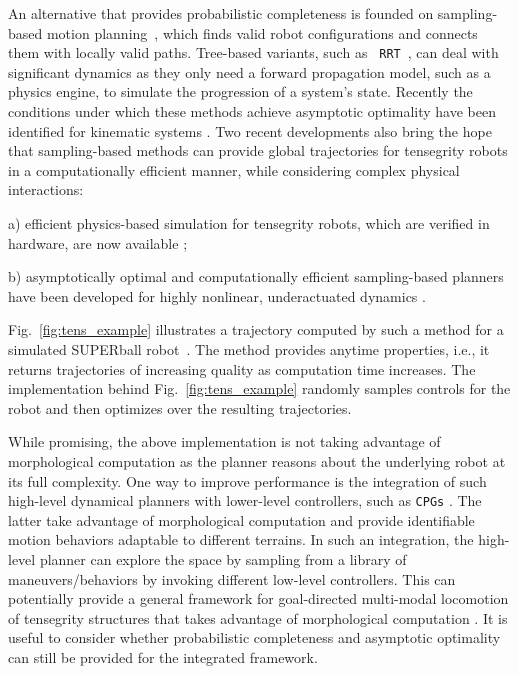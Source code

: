 An alternative that provides probabilistic completeness is founded on
sampling-based motion planning~\cite{Kavraki1996Probabilistic-R},
which finds valid robot configurations and connects them with locally
valid paths. Tree-based variants, such as {\tt
RRT}~\cite{LaValle2001}, can deal with significant dynamics as they
only need a forward propagation model, such as a physics engine, to
simulate the progression of a system's state.  Recently the conditions
under which these methods achieve asymptotic optimality have been
identified for kinematic systems
\cite{Karaman:2011aa}. Two recent developments also bring the hope
that sampling-based methods can provide global trajectories for
tensegrity robots in a computationally efficient manner, while
considering complex physical interactions:
\begin{myitem}
  \item[a)] efficient physics-based simulation for tensegrity robots,
    which are verified in hardware, are now available
    \cite{Caluwaerts2013rsif};
  \item[b)] asymptotically optimal and computationally efficient
    sampling-based planners have been developed for highly nonlinear,
    underactuated dynamics \cite{Li2015Sparse-Methods-}.
\end{myitem}

Fig.~\ref{fig:tens_example} illustrates a trajectory computed by such
a method \cite{Li2015Sparse-Methods-} for a simulated SUPERball
robot~\cite{SunSpiralSoftware}. The method provides anytime
properties, i.e., it returns trajectories of increasing quality as
computation time increases. The implementation behind
Fig.~\ref{fig:tens_example} randomly samples controls for the robot
and then optimizes over the resulting trajectories.

While promising, the above implementation is not taking advantage of
morphological computation as the planner reasons about the underlying
robot at its full complexity. One way to improve performance is the
integration of such high-level dynamical planners with lower-level
controllers, such as {\tt CPGs} \cite{Ijspeert2008,
Bliss2013Central-Pattern,MirletzSoftRobotics}. The latter take
advantage of morphological computation and provide identifiable motion
behaviors adaptable to different terrains. In such an integration, the
high-level planner can explore the space by sampling from a library of
maneuvers/behaviors by invoking different low-level controllers. This
can potentially provide a general framework for goal-directed
multi-modal locomotion of tensegrity structures that takes advantage
of morphological computation \cite{Nurzaman:2015aa,
Khazanov:2014aa}. It is useful to consider whether probabilistic
completeness and asymptotic optimality can still be provided for the
integrated framework.

